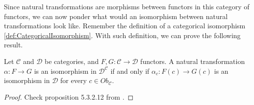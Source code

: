 Since natural transformations are morphisms between functors in this category of functors,
we can now ponder what would an isomorphism between natural transformations look like.
Remember the definition of a categorical isomorphism \ref{def:CategoricalIsomorphism}.
With such definition, we can prove the following result.

\begin{theorem}
  Let $\mathcal C$ and $\mathcal D$ be categories, and $F,G:\mathcal C \to \mathcal D$ functors.
  A natural transformation $\alpha : F \to G$ is an isomorphism in $\mathcal D^\mathcal C$
  if and only if $\alpha_c: F(c) \to G(c)$ is an isomorphism in $\mathcal D$ for every
  $c \in Ob_\mathcal C$.
\end{theorem}
\begin{proof}
  Check proposition 5.3.2.12 from \citet{spivak2014category}.
\end{proof}


